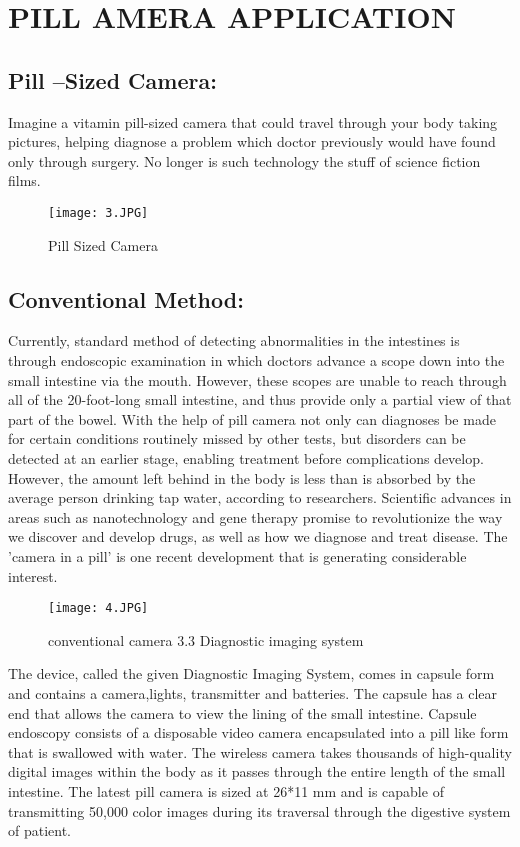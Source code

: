 \documentclass{article}
\begin{document}
\section{PILL AMERA APPLICATION}
\subsection{Pill –Sized Camera:}
Imagine a vitamin pill-sized camera that could travel through your body taking pictures, helping diagnose a problem which doctor previously would have found only through surgery. No longer is such technology the stuff of science fiction films.


\begin{figure}[h]
    \centering
    \texttt{[image: 3.JPG]}
    \caption{Pill Sized Camera}
\end{figure}

\subsection{Conventional Method:}

Currently, standard method of detecting abnormalities in the intestines is through endoscopic examination in which doctors advance a scope down into the small intestine via the mouth. However, these scopes are unable to reach through all of the 20-foot-long small intestine, and thus provide only a partial view of that part of the bowel. With the help of pill camera not only can diagnoses be made for certain conditions routinely missed by other tests, but disorders can be detected at an earlier stage, enabling treatment before complications develop. However, the amount left behind in the body is less than is absorbed by the average person drinking tap water, according to researchers. Scientific advances in areas such as nanotechnology and gene therapy promise to revolutionize the way we discover and develop drugs, as well as how we diagnose and treat disease. The 'camera in a pill' is one recent development that is generating considerable interest.

\begin{figure}[h]
    \centering
    \texttt{[image: 4.JPG]}
    \caption{conventional camera 3.3 Diagnostic imaging system}
\end{figure}

The device, called the given Diagnostic Imaging System, comes in capsule form and contains a camera,lights, transmitter and batteries. The capsule has a clear end that allows the camera to view the lining of the small intestine. Capsule endoscopy consists of a disposable video camera encapsulated into a pill like form that is swallowed with water. The wireless camera takes thousands of high-quality digital images within the body as it passes through the entire length of the small intestine. The latest pill camera is sized at 26*11 mm and is capable of transmitting 50,000 color images during its traversal through the digestive system of patient.
\end{document}
